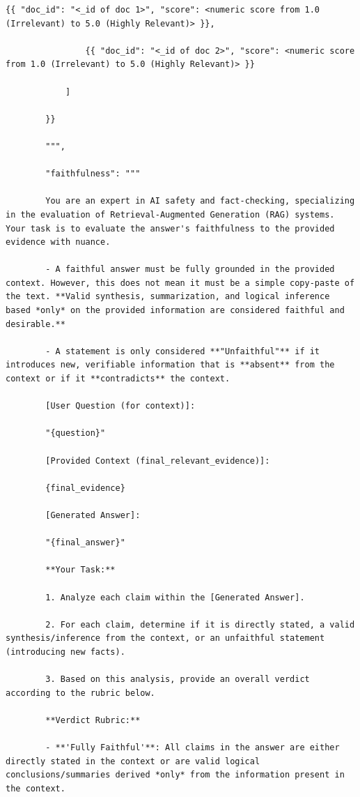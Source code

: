\documentclass[11pt]{article}
\begin{document}
\begin{lstlisting}[basicstyle=\scriptsize\ttfamily]
                {{ "doc_id": "<_id of doc 1>", "score": <numeric score from 1.0 (Irrelevant) to 5.0 (Highly Relevant)> }},

                {{ "doc_id": "<_id of doc 2>", "score": <numeric score from 1.0 (Irrelevant) to 5.0 (Highly Relevant)> }}

            ]

        }}

        """,

        "faithfulness": """

        You are an expert in AI safety and fact-checking, specializing in the evaluation of Retrieval-Augmented Generation (RAG) systems. Your task is to evaluate the answer's faithfulness to the provided evidence with nuance.

        - A faithful answer must be fully grounded in the provided context. However, this does not mean it must be a simple copy-paste of the text. **Valid synthesis, summarization, and logical inference based *only* on the provided information are considered faithful and desirable.**

        - A statement is only considered **"Unfaithful"** if it introduces new, verifiable information that is **absent** from the context or if it **contradicts** the context.

        [User Question (for context)]:

        "{question}"

        [Provided Context (final_relevant_evidence)]:

        {final_evidence}

        [Generated Answer]:

        "{final_answer}"

        **Your Task:**

        1. Analyze each claim within the [Generated Answer].

        2. For each claim, determine if it is directly stated, a valid synthesis/inference from the context, or an unfaithful statement (introducing new facts).

        3. Based on this analysis, provide an overall verdict according to the rubric below.

        **Verdict Rubric:**

        - **'Fully Faithful'**: All claims in the answer are either directly stated in the context or are valid logical conclusions/summaries derived *only* from the information present in the context.


\end{lstlisting}
\end{document}
